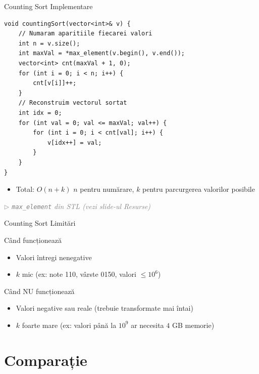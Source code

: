 \documentclass{beamer}
\newcommand{\beginnote}[1]{%
  \vfill
  {\footnotesize\textcolor{gray}{\textit{$\triangleright$ #1 (vezi slide-ul \emph{Resurse})}}}%
}
\begin{document}
\begin{frame}{Counting Sort \textemdash{} Implementare}
  \begin{lstlisting}
void countingSort(vector<int>& v) {
    // Numaram aparitiile fiecarei valori
    int n = v.size();
    int maxVal = *max_element(v.begin(), v.end());
    vector<int> cnt(maxVal + 1, 0);
    for (int i = 0; i < n; i++) {
        cnt[v[i]]++;
    }
    // Reconstruim vectorul sortat
    int idx = 0;
    for (int val = 0; val <= maxVal; val++) {
        for (int i = 0; i < cnt[val]; i++) {
            v[idx++] = val;
        }
    }
}
  \end{lstlisting}
  \begin{itemize}
    \item Total: $O(n + k)$ \textemdash{} $n$ pentru numărare, $k$ pentru parcurgerea valorilor posibile
  \end{itemize}
  \beginnote{\texttt{max\_element} \textemdash{} din STL}
\end{frame}

\begin{frame}{Counting Sort \textemdash{} Limitări}
  \begin{block}{Când funcționează}
    \begin{itemize}
      \item Valori întregi nenegative
      \item $k$ mic (ex: note 1\textendash{}10, vârste 0\textendash{}150, valori $\leq 10^6$)
    \end{itemize}
  \end{block}
  \begin{block}{Când NU funcționează}
    \begin{itemize}
      \item Valori negative sau reale (trebuie transformate mai întai)
      \item $k$ foarte mare (ex: valori până la $10^9$ \textemdash{} ar necesita $4$ GB memorie)
    \end{itemize}
  \end{block}
\end{frame}

\section{Comparație}
\end{document}
